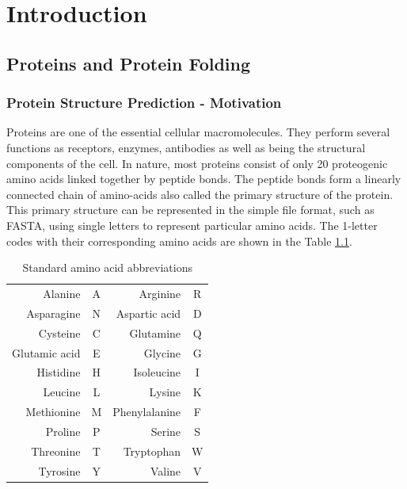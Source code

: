 \chapter{Introduction}

\section{Proteins and Protein Folding}

\subsection{Protein Structure Prediction - Motivation}
    
    
Proteins are one of the essential cellular macromolecules. 
They perform several functions as receptors, enzymes, antibodies as well as being the structural components of the cell.
In nature, most proteins consist of only 20 proteogenic amino acids linked together by peptide bonds.
The peptide bonds form a linearly connected chain of amino-acids also called the primary structure of the protein.
This primary structure can be represented in the simple file format, such as FASTA, using single letters to represent particular amino acids.
The 1-letter codes with their corresponding amino acids are shown in the Table \ref{tab:aa_codes}.

\begin{table}[]
    \centering
    \begin{tabular}{r|c|r|c|}
        Alanine & A & Arginine & R \\
        Asparagine & N & Aspartic acid & D \\
        Cysteine & C & Glutamine & Q \\
        Glutamic acid & E & Glycine & G \\
        Histidine & H & Isoleucine & I \\
        Leucine & L & Lysine & K \\
        Methionine & M & Phenylalanine & F \\
        Proline & P & Serine & S \\
        Threonine & T & Tryptophan & W \\
        Tyrosine & Y & Valine & V
    \end{tabular}
    \caption{Standard amino acid abbreviations}
    \label{tab:aa_codes}
\end{table}

